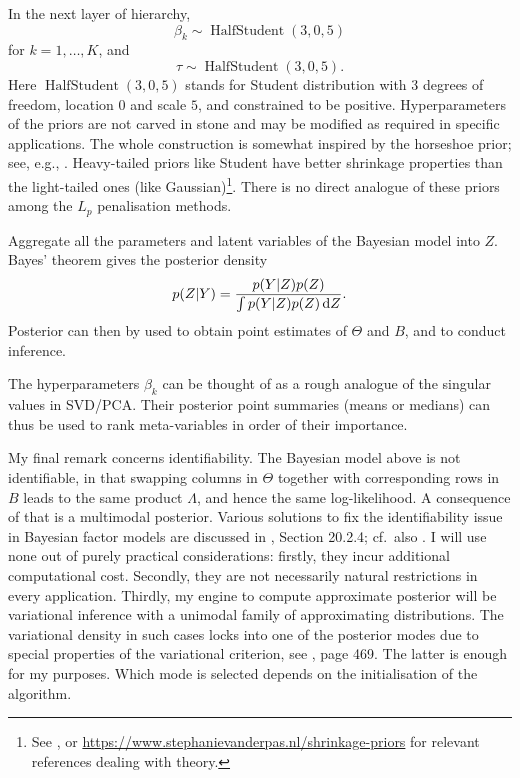 \documentclass[]{article}
\begin{document}
In the next layer of hierarchy,
\[
\beta_k \sim \operatorname{HalfStudent}(3, 0, 5)
\]
for $k=1,\ldots,K$, and
\[
\tau \sim \operatorname{HalfStudent}(3, 0, 5).
\]
Here $ \operatorname{HalfStudent}(3, 0, 5)$ stands for Student distribution with 3 degrees of freedom, location $0$ and scale $5$, and constrained to be positive. Hyperparameters of the priors are not carved in stone and may be modified as required in specific applications. The whole construction is somewhat inspired by the horseshoe prior; see, e.g., \citet{carvalho2009}. Heavy-tailed priors like Student have better shrinkage properties than the light-tailed ones (like Gaussian)\footnote{See \citet{carvalho2009}, or \url{https://www.stephanievanderpas.nl/shrinkage-priors} for relevant references dealing with theory.}. There is no direct analogue of these priors among the $L_p$ penalisation methods.


Aggregate all the parameters and latent variables of the Bayesian model into $Z$. Bayes' theorem gives the posterior density
\begin{equation}
\label{bayes}
p(Z|Y) = \frac{p(Y|Z)p(Z)}{\int p(Y|Z)p(Z) \odif{Z}}.
\end{equation}
Posterior can then by used to obtain point estimates of $\Theta$ and $B$, and to conduct inference.

The hyperparameters $\beta_k$ can be thought of as a rough analogue of the singular values in SVD/PCA. Their posterior point summaries (means or medians) can thus be used to rank meta-variables in order of their importance.

My final remark concerns identifiability. The Bayesian model above is not identifiable, in that swapping columns in $\Theta$ together with corresponding rows in $B$ leads to the same product $\Lambda$, and hence the same log-likelihood. A consequence of that is a multimodal posterior. Various solutions to fix the identifiability issue in Bayesian factor models are discussed in \citet{murphy2022}, Section 20.2.4; cf.~also \citet{kucukelbir2017}. I will use none out of purely practical considerations: firstly, they incur additional computational cost. Secondly, they are not necessarily natural restrictions in every application. Thirdly, my engine to compute approximate posterior will be variational inference with a unimodal family of approximating distributions. The variational density in such cases locks into one of the posterior modes due to special properties of the variational criterion, see \citet{bishop2006}, page 469. The latter is enough for my purposes. Which mode is selected depends on the initialisation of the algorithm.
\end{document}
